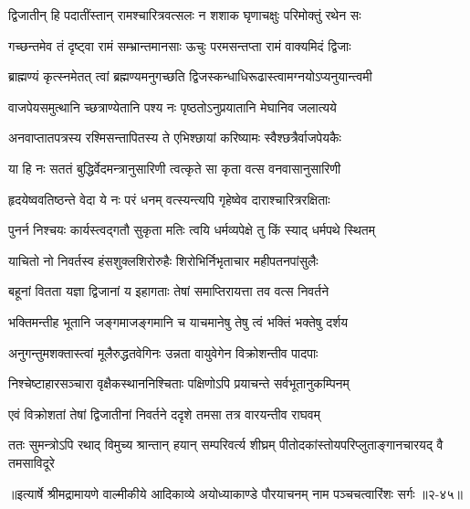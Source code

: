 \twolineshloka
{द्विजातीन् हि पदातींस्तान् रामश्चारित्रवत्सलः}
{न शशाक घृणाचक्षुः परिमोक्तुं रथेन सः} %

\twolineshloka
{गच्छन्तमेव तं दृष्ट्वा रामं सम्भ्रान्तमानसाः}
{ऊचुः परमसन्तप्ता रामं वाक्यमिदं द्विजाः} %

\twolineshloka
{ब्राह्मण्यं कृत्स्नमेतत् त्वां ब्रह्मण्यमनुगच्छति}
{द्विजस्कन्धाधिरूढास्त्वामग्नयोऽप्यनुयान्त्वमी} %

\twolineshloka
{वाजपेयसमुत्थानि च्छत्राण्येतानि पश्य नः}
{पृष्ठतोऽनुप्रयातानि मेघानिव जलात्यये} %

\twolineshloka
{अनवाप्तातपत्रस्य रश्मिसन्तापितस्य ते}
{एभिश्छायां करिष्यामः स्वैश्छत्रैर्वाजपेयकैः} %

\twolineshloka
{या हि नः सततं बुद्धिर्वेदमन्त्रानुसारिणी}
{त्वत्कृते सा कृता वत्स वनवासानुसारिणी} %

\twolineshloka
{हृदयेष्ववतिष्ठन्ते वेदा ये नः परं धनम्}
{वत्स्यन्त्यपि गृहेष्वेव दाराश्चारित्ररक्षिताः} %

\twolineshloka
{पुनर्न निश्चयः कार्यस्त्वद्गतौ सुकृता मतिः}
{त्वयि धर्मव्यपेक्षे तु किं स्याद् धर्मपथे स्थितम्} %

\twolineshloka
{याचितो नो निवर्तस्व हंसशुक्लशिरोरुहैः}
{शिरोभिर्निभृताचार महीपतनपांसुलैः} %

\twolineshloka
{बहूनां वितता यज्ञा द्विजानां य इहागताः}
{तेषां समाप्तिरायत्ता तव वत्स निवर्तने} %

\twolineshloka
{भक्तिमन्तीह भूतानि जङ्गमाजङ्गमानि च}
{याचमानेषु तेषु त्वं भक्तिं भक्तेषु दर्शय} %

\twolineshloka
{अनुगन्तुमशक्तास्त्वां मूलैरुद्धतवेगिनः}
{उन्नता वायुवेगेन विक्रोशन्तीव पादपाः} %

\twolineshloka
{निश्चेष्टाहारसञ्चारा वृक्षैकस्थाननिश्चिताः}
{पक्षिणोऽपि प्रयाचन्ते सर्वभूतानुकम्पिनम्} %

\twolineshloka
{एवं विक्रोशतां तेषां द्विजातीनां निवर्तने}
{ददृशे तमसा तत्र वारयन्तीव राघवम्} %

\twolineshloka
{ततः सुमन्त्रोऽपि रथाद् विमुच्य श्रान्तान् हयान् सम्परिवर्त्य शीघ्रम्}
{पीतोदकांस्तोयपरिप्लुताङ्गानचारयद् वै तमसाविदूरे} %


॥इत्यार्षे श्रीमद्रामायणे वाल्मीकीये आदिकाव्ये अयोध्याकाण्डे पौरयाचनम् नाम पञ्चचत्वारिंशः सर्गः ॥२-४५॥
